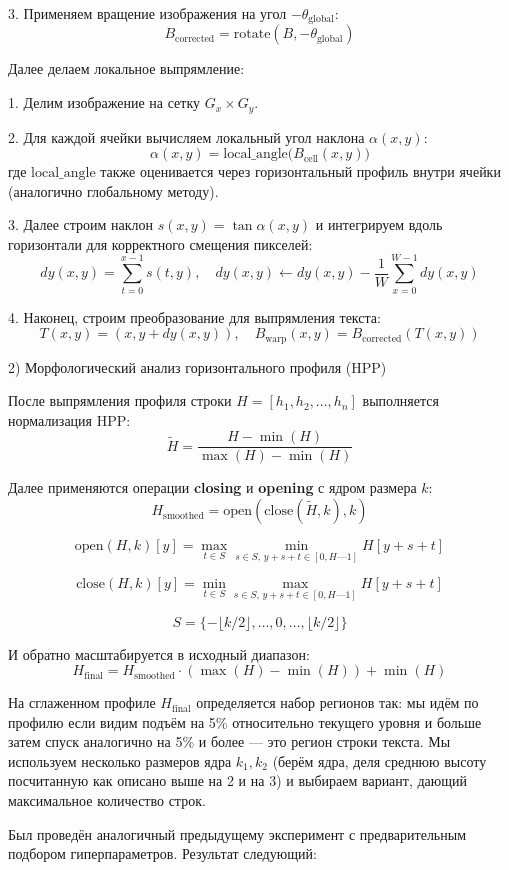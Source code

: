 \documentclass{article}
\begin{document}
3. Применяем вращение изображения на угол $-\theta_\text{global}$:
\[
B_\text{corrected} = \text{rotate}(B, -\theta_\text{global})
\]

Далее делаем локальное выпрямление:

1. Делим изображение на сетку $G_x \times G_y$.  

2. Для каждой ячейки вычисляем локальный угол наклона $\alpha(x, y)$:
\[
\alpha(x, y) = \text{local\_angle}\Big( B_\text{cell}(x, y) \Big)
\]
где $\text{local\_angle}$ также оценивается через горизонтальный профиль внутри ячейки (аналогично глобальному методу).

3. Далее строим наклон $s(x, y) = \tan \alpha(x, y)$ и интегрируем вдоль горизонтали для корректного смещения пикселей:
\[
dy(x, y) = \sum_{t=0}^{x-1} s(t, y), \quad dy(x, y) \gets dy(x, y) - \frac{1}{W} \sum_{x=0}^{W-1} dy(x, y)
\]

4. Наконец, строим преобразование для выпрямления текста:
\[
T(x, y) = (x, y + dy(x, y)), \quad
B_\text{warp}(x, y) = B_\text{corrected}(T(x, y))
\]

2) Морфологический анализ горизонтального профиля (HPP)

После выпрямления профиля строки $H = [h_1, h_2, \dots, h_n]$ выполняется нормализация HPP:
\[
\tilde{H} = \frac{H - \min(H)}{\max(H) - \min(H)}
\]

Далее применяются операции \textbf{closing} и \textbf{opening} с ядром размера $k$:
\[
H_{\text{smoothed}} = \text{open}(\text{close}(\tilde{H}, k), k)
\]

\[
\text{open}(H, k)[y] = \max_{t \in S} \min_{s \in S, \, y+s+t \in [0,H—1]} H[y+s+t]
\]

\[
\text{close}(H,k)[y] = \min_{t \in S} \max_{s \in S, \, y+s+t \in [0,H—1]} H[y+s+t]
\]

\[
S = \{-\lfloor k/2 \rfloor, \dots, 0, \dots, \lfloor k/2 \rfloor\}
\]


И обратно масштабируется в исходный диапазон:
\[
H_{\text{final}} = H_{\text{smoothed}} \cdot (\max(H)-\min(H)) + \min(H)
\]

На сглаженном профиле $H_{\text{final}}$ определяется набор регионов так: мы идём по профилю если видим подъём на 5\% относительно текущего уровня и больше затем спуск аналогично на 5\% и более — это регион строки текста. Мы используем несколько размеров ядра $k_1, k_2$ (берём ядра, деля среднюю высоту посчитанную как описано выше на 2 и на 3) и выбираем вариант, дающий максимальное количество строк.

Был проведён аналогичный предыдущему эксперимент с предварительным подбором гиперпараметров. Результат следующий:
\end{document}
